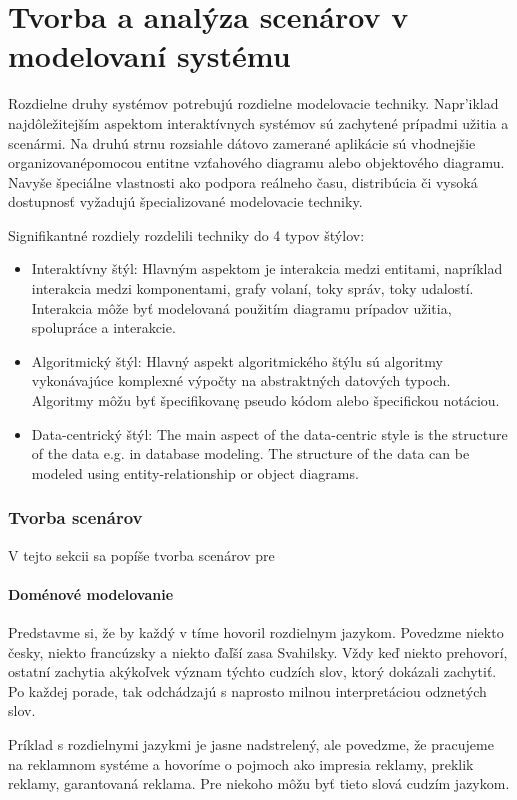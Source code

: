 \chapter{Tvorba a analýza scenárov v modelovaní systému}
 Rozdielne druhy systémov potrebujú rozdielne modelovacie techniky. Napr'iklad najdôležitejším aspektom interaktívnych systémov sú zachytené prípadmi užitia a scenármi. Na druhú strnu rozsiahle dátovo zamerané aplikácie sú vhodnejšie organizovanépomocou entitne vzťahového diagramu alebo objektového diagramu. Navyše špeciálne vlastnosti ako podpora reálneho času, distribúcia či vysoká dostupnosť vyžadujú špecializované modelovacie techniky.
 
 Signifikantné rozdiely rozdelili techniky do 4 typov štýlov:

 
 \begin{itemize}
 	\item Interaktívny štýl: Hlavným aspektom je interakcia medzi entitami, napríklad interakcia medzi komponentami, grafy volaní, toky správ, toky udalostí. Interakcia môže byť modelovaná použitím diagramu prípadov užitia, spolupráce a interakcie.
 	\item Algoritmický štýl: Hlavný aspekt algoritmického štýlu sú algoritmy vykonávajúce komplexné výpočty na abstraktných datových typoch. Algoritmy môžu byť špecifikovanę pseudo kódom alebo špecifickou notáciou.
 	\item Data-centrický štýl: The main aspect of the data-centric style is the structure of the data e.g.
 	in database modeling. The structure of the data can be modeled using entity-relationship or
 	object diagrams.
 \end{itemize}

\subsection{Tvorba scenárov}
V tejto sekcii sa popíše tvorba scenárov pre 
\subsubsection{Doménové modelovanie}
Predstavme si, že by každý v tíme hovoril rozdielnym jazykom. Povedzme niekto česky, niekto francúzsky a niekto ďaľší zasa Svahilsky. Vždy keď niekto prehovorí, ostatní zachytia akýkoľvek význam týchto cudzích slov, ktorý dokázali zachytiť. Po každej porade, tak odchádzajú s naprosto milnou interpretáciou odznetých slov.

Príklad s rozdielnymi jazykmi je jasne nadstrelený, ale
povedzme, že pracujeme na reklamnom systéme a hovoríme o pojmoch ako impresia reklamy, preklik reklamy, garantovaná reklama. Pre niekoho môžu byť tieto slová cudzím jazykom.

